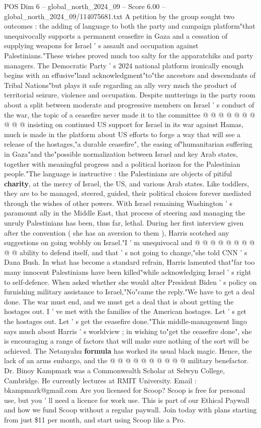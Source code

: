 \begin{textsample}{POS Dim 6 – global\_north\_2024\_09 – Score 6.00 – global\_north\_2024\_09/114075681.txt}
A petition by the group sought two outcomes : the adding of language to both the party and campaign platform"that unequivocally supports a permanent ceasefire in Gaza and a cessation of supplying weapons for Israel ' s assault and occupation against Palestinians."These wishes proved much too salty for the apparatchiks and party managers.
The Democratic Party ' s 2024 national platform ironically enough begins with an effusive"land acknowledgment"to"the ancestors and descendants of Tribal Nations"but plays it safe regarding an ally very much the product of territorial seizure, violence and occupation.
Despite mutterings in the party room about a split between moderate and progressive members on Israel ' s conduct of the war, the topic of a ceasefire never made it to the committee @ @ @ @ @ @ @ @ @ @ insisting on continued US support for Israel in its war against Hamas, much is made in the platform about US efforts to forge a way that will see a release of the hostages,"a durable ceasefire", the easing of"humanitarian suffering in Gaza"and the"possible normalization between Israel and key Arab states, together with meaningful progress and a political horizon for the Palestinian people."The language is instructive : the Palestinians are objects of pitiful \textbf{charity}, at the mercy of Israel, the US, and various Arab states.
Like toddlers, they are to be managed, steered, guided, their political choices forever mediated through the wishes of other powers.
With Israel remaining Washington ' s paramount ally in the Middle East, that process of steering and managing the unruly Palestinians has been, thus far, lethal.
During her first interview given after the convention ( she has an aversion to them ), Harris scotched any suggestions on going wobbly on Israel."I ' m unequivocal and @ @ @ @ @ @ @ @ @ @ ability to defend itself, and that ' s not going to change,"she told CNN ' s Dana Bush.
In what has become a standard refrain, Harris lamented that"far too many innocent Palestinians have been killed"while acknowledging Israel ' s right to self-defence.
When asked whether she would alter President Biden ' s policy on furnishing military assistance to Israel,"No"came the reply."We have to get a deal done.
The war must end, and we must get a deal that is about getting the hostages out.
I ' ve met with the families of the American hostages.
Let ' s get the hostages out.
Let ' s get the ceasefire done."This middle-management lingo says much about Harris ' s worldview ; in wishing to"get the ceasefire done", she is encouraging a range of factors that will make sure nothing of the sort will be achieved.
The Netanyahu \textbf{formula} has worked its usual black magic.
Hence, the lack of an arms embargo, and the @ @ @ @ @ @ @ @ @ @ military benefactor.
Dr.
Binoy Kampmark was a Commonwealth Scholar at Selwyn College, Cambridge.
He currently lectures at RMIT University.
Email : bkampmark@gmail.com Are you licensed for Scoop?
Scoop is free for personal use, but you ' ll need a licence for work use.
This is part of our Ethical Paywall and how we fund Scoop without a regular paywall.
Join today with plans starting from just \$11 per month, and start using Scoop like a Pro.


\end{textsample}
